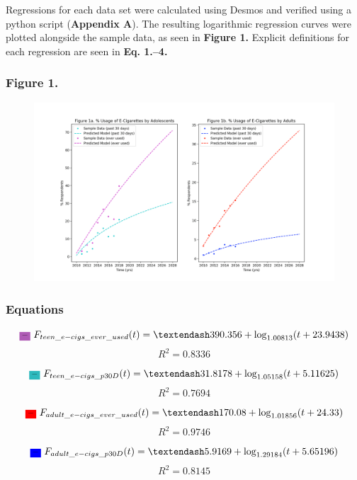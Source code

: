 Regressions for each data set were calculated using Desmos and verified using a python script (\textbf{Appendix A}). The resulting logarithmic regression curves were plotted alongside the sample data, as seen in \textbf{Figure 1.} Explicit definitions for each regression are seen in \textbf{Eq. 1.–4.}

\subsubsection*{Figure 1.}
\begin{figure}[H]
    \centering \includegraphics*[scale=1]{assets/math-modeling-figure-1.png}
\end{figure}

\subsubsection*{Equations}

\begin{equation}
    \text{\colorbox{Orchid}{--} } F_{teen\_e-cigs\_ever\_used}(t) = –390.356 + \log_{1.00813}(t + 23.9438)
\end{equation}
\[R^2 = 0.8336\]

\begin{equation}
    \text{\colorbox{Aquamarine}{--} } F_{teen\_e-cigs\_p30D}(t) = –31.8178 + \log_{1.05158}(t + 5.11625)
\end{equation}
\[R^2 = 0.7694\]

\begin{equation}
    \text{\colorbox{red}{--} } F_{adult\_e-cigs\_ever\_used}(t) = –170.08+ \log_{1.01856}(t + 24.33)
\end{equation}
\[R^2 = 0.9746\]

\begin{equation}
    \text{\colorbox{blue}{--} } F_{adult\_e-cigs\_p30D}(t) = –5.9169 + \log_{1.29184}(t + 5.65196)
\end{equation}
\[R^2 = 0.8145\]

